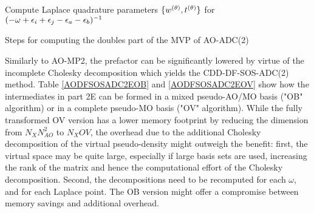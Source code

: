 \begin{algorithm}
Compute Laplace quadrature parameters $\{w^{(\theta)},t^{(\theta)}\}$ for $(-\omega + \epsilon_i + \epsilon_j - \epsilon_a - \epsilon_b)^{-1}$ \\
\caption{Steps for computing the doubles part of the MVP of AO-ADC(2)}
\label{AODFSOSADC2E}
\end{algorithm}

Similarly to AO-MP2, the prefactor can be significantly lowered by virtue of the incomplete Cholesky decomposition which yields the CDD-DF-SOS-ADC(2) method. Table \ref{AODFSOSADC2EOB} and \ref{AODFSOSADC2EOV} show how the intermediates in part 2E can be formed in a mixed pseudo-AO/MO basis ("OB" algorithm) or in a complete pseudo-MO basis ("OV" algorithm). While the fully transformed OV version has a lower memory footprint by reducing the dimension from $N_XN_{AO}^2$ to $N_XOV$, the overhead due to the additional Cholesky decomposition of the virtual pseudo-density might outweigh the benefit: first, the virtual space may be quite large, especially if large basis sets are used, increasing the rank of the matrix and hence the computational effort of the Cholesky decomposition. Second, the decompositions need to be recomputed for each $\omega$, and for each Laplace point. The OB version might offer a compromise between memory savings and additional overhead. 

